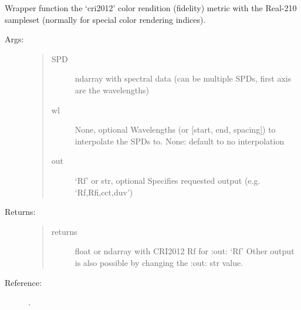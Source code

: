 \documentclass[letterpaper,10pt,english]{sphinxmanual}
\begin{document}
\begin{fulllineitems}
\label{\detokenize{color:luxpy.color.cri.spd_to_cri2012_real210}}
Wrapper function the ‘cri2012’ color rendition (fidelity) metric 
with the Real-210 sampleset (normally for special color rendering indices).
\begin{description}
\item[{Args:}] \leavevmode\begin{quote}\begin{description}
\item[{SPD}] \leavevmode
ndarray with spectral data (can be multiple SPDs, 
first axis are the wavelengths)

\item[{wl}] \leavevmode
None, optional
Wavelengths (or {[}start, end, spacing{]}) to interpolate the SPDs to. 
None: default to no interpolation

\item[{out}] \leavevmode
‘Rf’ or str, optional
Specifies requested output (e.g. ‘Rf,Rfi,cct,duv’)

\end{description}\end{quote}

\item[{Returns:}] \leavevmode\begin{quote}\begin{description}
\item[{returns}] \leavevmode
float or ndarray with CRI2012 Rf for :out: ‘Rf’
Other output is also possible by changing the :out: str value.

\end{description}\end{quote}

\item[{Reference:}] . 

\end{description}

\end{fulllineitems}

\end{document}

